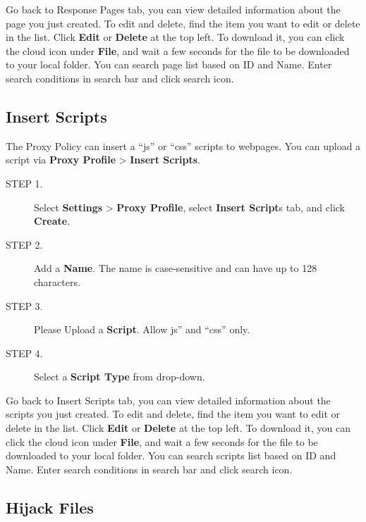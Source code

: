 Go back to Response Pages tab, you can view detailed information about the page you just created. 
To edit and delete, find the item you want to edit or delete in the list. Click \textbf{Edit} or \textbf{Delete} at the top left. 
To download it, you can click the cloud icon under \textbf{File}, and wait a few seconds for the file to be downloaded to your local folder. 
You can search page list based on ID and Name. Enter search conditions in search bar and click search icon.

\subsection*{\hypertarget{link:Insert Scripts}{Insert Scripts}}
\label{sec:decrypt:profile:insert}

The Proxy Policy can insert a “js” or “css” scripts to webpages. You can upload a script via \textbf{Proxy Profile} > \textbf{Insert Scripts}.

\begin{description}
    \item[STEP 1.]	Select \textbf{Settings} > \textbf{Proxy Profile}, select \textbf{Insert Script}s tab, and click \textbf{Create}.
    \item[STEP 2.]	Add a \textbf{Name}. The name is case-sensitive and can have up to 128 characters.
    \item[STEP 3.]	Please Upload a \textbf{Script}. Allow js” and “css” only.
    \item[STEP 4.]	Select a \textbf{Script Type} from drop-down.     
\end{description}    

Go back to Insert Scripts tab, you can view detailed information about the scripts you just created. 
To edit and delete, find the item you want to edit or delete in the list. 
Click \textbf{Edit} or \textbf{Delete} at the top left. To download it, you can click the cloud icon under \textbf{File}, 
and wait a few seconds for the file to be downloaded to your local folder. 
You can search scripts list based on ID and Name. Enter search conditions in search bar and click search icon.

\subsection*{\hypertarget{link:Hijack Files}{Hijack Files}}
\label{sec:decrypt:profile:hijack}

